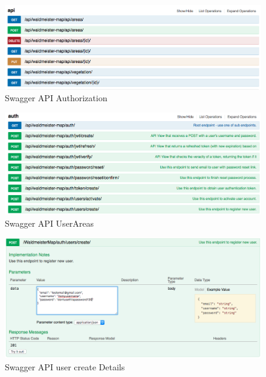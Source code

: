 \begin{figure}[H]
\centering
    \includegraphics[width=1\textwidth]{swagger1}
    \caption{Swagger API Authorization}
    \label{fig:swagger1}
\end{figure}

\begin{figure}[H]
\centering
    \includegraphics[width=1\textwidth]{swagger2}
    \caption{Swagger API UserAreas}
    \label{fig:swagger2}
\end{figure}

\begin{figure}[H]
\centering
    \includegraphics[width=1\textwidth]{swaggerdetails}
    \caption{Swagger API user create Details}
    \label{fig:swagger3}
\end{figure}

